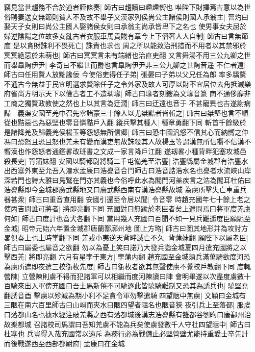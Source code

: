 竊見當世趨務不合於道者謹條奏|{
	師古曰趨讀曰趣趣嚮也}
唯陛下財擇焉吉意以為世俗聘妻送女無節則貧人不及故不舉子又漢家列侯尚公主諸侯則國人承翁主|{
	晉灼曰娶天子女則曰尚公主國人娶諸侯女則曰承翁主尚承皆卑下之名也}
使男事女夫屈於婦逆隂陽之位故多女亂古者衣服車馬貴賤有章今上下僭奢人人自制|{
	師古曰言無節度}
是以貪財誅利不畏死亡|{
	誅責也求也}
周之所以能致治刑措而不用者以其禁邪於冥冥絶惡於未萌也|{
	師古曰冥冥言未有端緒也治直吏翻}
又言舜湯不用三公九卿之世而舉臯陶伊尹|{
	李奇曰不繼世而爵也言臯陶伊尹非三公九卿之世陶音遥}
不仁者遠|{
	師古曰任用賢人放黜讒佞}
今使俗吏得任子弟|{
	張晏曰子弟以父兄任為郎}
率多驕驁不通古今無益于民宜明選求賢除任子之令外家及故人可厚以財不宜居位去角抵減樂府省尚方明示天下以儉古者工不造琱瑑|{
	師古曰瑑者刻鏤為文瑑音篆}
商不通侈靡非工商之獨賢政教使之然也上以其言為迂濶|{
	師古曰迂遠也音于}
不甚寵異也吉遂謝病歸　義渠安國至羌中召先零諸豪三十餘人以尤桀黠者皆斬之|{
	師古曰桀堅也言不順從也黠惡也為惡堅也零音憐黠戶入翻}
縱兵擊其種人|{
	種章勇翻下同}
斬首千餘級於是諸降羌及歸義羌侯楊玉等怨怒無所信郷|{
	師古曰恐中國汎怒不信其心而納嚮之仲馮曰恐怒且恐且怒也羌未有變而漢吏無故誅殺其人故楊玉等謂漢無所信嚮不信漢不嚮漢也作怨怒者通鑑畧改班書之文成一家言降戶江翻}
遂刼畧小種背畔犯塞攻城邑殺長吏|{
	背蒲妹翻}
安國以騎都尉將騎二千屯備羌至浩亹|{
	浩亹縣屬金城郡有浩亹水出西塞外東至允吾入湟水孟康曰浩亹音合門師古曰浩音誥浩水名也亹者水流峽山岸深若門也詩大雅曰鳬鷖在門亦其義也今俗呼此水為閣門河盖疾言之浩為閣耳杜佑曰浩亹縣即今金城郡廣武縣地又曰廣武縣西南有漢浩亹縣故城}
為虜所擊失亡車重兵器甚衆|{
	師古曰重音直用翻}
安國引還至令居以聞|{
	令音零}
時趙充國年七十餘上老之使丙吉問誰可將者|{
	將即亮翻下同}
充國對曰無踰於老臣者矣上遣問焉曰將軍度羌虜何如|{
	師古曰度計也音犬各翻下同}
當用幾人充國曰百聞不如一見兵難遥度臣願馳至金城|{
	昭帝元始六年置金城郡唐蘭鄯廓州地}
圖上方略|{
	師古曰圖其地形并為攻討方畧俱奏上也上時掌翻下同}
羌戎小夷逆天背畔滅亡不久|{
	背蒲妹翻}
願陛下以屬老臣|{
	師古曰屬委也屬音之欲翻}
勿以為憂上笑曰諾乃大發兵詣金城夏四月遣充國將之以擊西羌|{
	將即亮翻}
六月有星孛于東方|{
	孛蒲内翻}
趙充國至金城須兵滿萬騎欲度河恐為虜所遮即夜遣三校衘枚先度|{
	師古曰衘枚者欲其無聲使虜不覺校戶教翻下同}
度輒營陳|{
	立營陳則虜不得而犯諸軍可以相繼而度河陳讀曰陣}
會明畢遂以次盡度虜數十百騎來出入軍傍充國曰吾士馬新倦不可馳逐此皆驍騎難制又恐其為誘兵也|{
	驍堅堯翻誘音酉}
擊虜以殄滅為期小利不足貪令軍勿擊遣騎四望陿中無虜|{
	文穎曰金城有三陿在南六百里師古曰山峭而夾水曰陿四望者陿名也陿音狹}
夜引兵上至落都|{
	服䖍曰落都山名也據水經注破羌縣之西有落都城後漢志浩亹縣有雒都谷劉昫曰唐鄯州治故樂都城}
召諸校司馬謂曰吾知羌虜不能為兵矣使虜發數千人守杜四望陿中|{
	師古曰杜塞也}
兵豈得入哉充國常以遠斥為務行必為戰備止必堅營壁尤能持重愛士卒先計而後戰遂西至西部都尉府|{
	孟康曰在金城}
